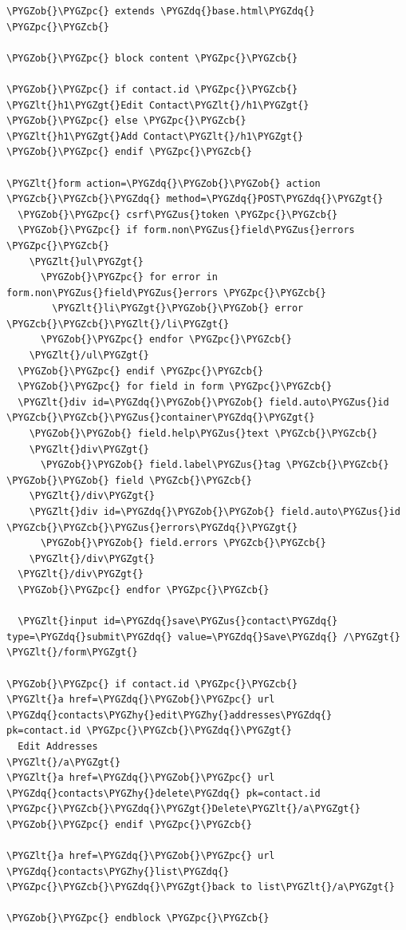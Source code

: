 \documentclass[letterpaper,10pt,english]{sphinxmanual}
\def\PYGZus{\char`\_}
\def\PYGZob{\char`\{}
\def\PYGZcb{\char`\}}
\def\PYGZlt{\char`\<}
\def\PYGZgt{\char`\>}
\def\PYGZpc{\char`\%}
\def\PYGZhy{\char`\-}
\def\PYGZdq{\char`\"}
\begin{document}
\begin{Verbatim}[commandchars=\\\{\}]
\PYGZob{}\PYGZpc{} extends \PYGZdq{}base.html\PYGZdq{} \PYGZpc{}\PYGZcb{}

\PYGZob{}\PYGZpc{} block content \PYGZpc{}\PYGZcb{}

\PYGZob{}\PYGZpc{} if contact.id \PYGZpc{}\PYGZcb{}
\PYGZlt{}h1\PYGZgt{}Edit Contact\PYGZlt{}/h1\PYGZgt{}
\PYGZob{}\PYGZpc{} else \PYGZpc{}\PYGZcb{}
\PYGZlt{}h1\PYGZgt{}Add Contact\PYGZlt{}/h1\PYGZgt{}
\PYGZob{}\PYGZpc{} endif \PYGZpc{}\PYGZcb{}

\PYGZlt{}form action=\PYGZdq{}\PYGZob{}\PYGZob{} action \PYGZcb{}\PYGZcb{}\PYGZdq{} method=\PYGZdq{}POST\PYGZdq{}\PYGZgt{}
  \PYGZob{}\PYGZpc{} csrf\PYGZus{}token \PYGZpc{}\PYGZcb{}
  \PYGZob{}\PYGZpc{} if form.non\PYGZus{}field\PYGZus{}errors \PYGZpc{}\PYGZcb{}
    \PYGZlt{}ul\PYGZgt{}
      \PYGZob{}\PYGZpc{} for error in form.non\PYGZus{}field\PYGZus{}errors \PYGZpc{}\PYGZcb{}
        \PYGZlt{}li\PYGZgt{}\PYGZob{}\PYGZob{} error \PYGZcb{}\PYGZcb{}\PYGZlt{}/li\PYGZgt{}
      \PYGZob{}\PYGZpc{} endfor \PYGZpc{}\PYGZcb{}
    \PYGZlt{}/ul\PYGZgt{}
  \PYGZob{}\PYGZpc{} endif \PYGZpc{}\PYGZcb{}
  \PYGZob{}\PYGZpc{} for field in form \PYGZpc{}\PYGZcb{}
  \PYGZlt{}div id=\PYGZdq{}\PYGZob{}\PYGZob{} field.auto\PYGZus{}id \PYGZcb{}\PYGZcb{}\PYGZus{}container\PYGZdq{}\PYGZgt{}
    \PYGZob{}\PYGZob{} field.help\PYGZus{}text \PYGZcb{}\PYGZcb{}
    \PYGZlt{}div\PYGZgt{}
      \PYGZob{}\PYGZob{} field.label\PYGZus{}tag \PYGZcb{}\PYGZcb{} \PYGZob{}\PYGZob{} field \PYGZcb{}\PYGZcb{}
    \PYGZlt{}/div\PYGZgt{}
    \PYGZlt{}div id=\PYGZdq{}\PYGZob{}\PYGZob{} field.auto\PYGZus{}id \PYGZcb{}\PYGZcb{}\PYGZus{}errors\PYGZdq{}\PYGZgt{}
      \PYGZob{}\PYGZob{} field.errors \PYGZcb{}\PYGZcb{}
    \PYGZlt{}/div\PYGZgt{}
  \PYGZlt{}/div\PYGZgt{}
  \PYGZob{}\PYGZpc{} endfor \PYGZpc{}\PYGZcb{}

  \PYGZlt{}input id=\PYGZdq{}save\PYGZus{}contact\PYGZdq{} type=\PYGZdq{}submit\PYGZdq{} value=\PYGZdq{}Save\PYGZdq{} /\PYGZgt{}
\PYGZlt{}/form\PYGZgt{}

\PYGZob{}\PYGZpc{} if contact.id \PYGZpc{}\PYGZcb{}
\PYGZlt{}a href=\PYGZdq{}\PYGZob{}\PYGZpc{} url \PYGZdq{}contacts\PYGZhy{}edit\PYGZhy{}addresses\PYGZdq{} pk=contact.id \PYGZpc{}\PYGZcb{}\PYGZdq{}\PYGZgt{}
  Edit Addresses
\PYGZlt{}/a\PYGZgt{}
\PYGZlt{}a href=\PYGZdq{}\PYGZob{}\PYGZpc{} url \PYGZdq{}contacts\PYGZhy{}delete\PYGZdq{} pk=contact.id \PYGZpc{}\PYGZcb{}\PYGZdq{}\PYGZgt{}Delete\PYGZlt{}/a\PYGZgt{}
\PYGZob{}\PYGZpc{} endif \PYGZpc{}\PYGZcb{}

\PYGZlt{}a href=\PYGZdq{}\PYGZob{}\PYGZpc{} url \PYGZdq{}contacts\PYGZhy{}list\PYGZdq{} \PYGZpc{}\PYGZcb{}\PYGZdq{}\PYGZgt{}back to list\PYGZlt{}/a\PYGZgt{}

\PYGZob{}\PYGZpc{} endblock \PYGZpc{}\PYGZcb{}
\end{Verbatim}
\end{document}
